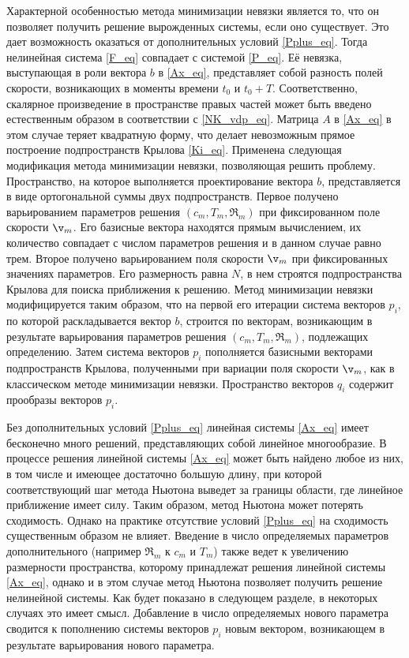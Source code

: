Характерной особенностью метода минимизации невязки является то, что он позволяет получить решение вырожденных системы, если оно существует. Это дает возможность оказаться от дополнительных условий \eqref{Pplus_eq}. Тогда нелинейная система \eqref{F_eq} совпадает с системой \eqref{P_eq}. Её невязка, выступающая в роли вектора $b$ в \eqref{Ax_eq}, представляет собой разность полей скорости, возникающих в моменты времени $t_0$ и $t_0 + T$. Соответственно, скалярное произведение в пространстве правых частей может быть введено естественным образом в соответствии с \eqref{NK_vdp_eq}. Матрица $A$ в \eqref{Ax_eq} в этом случае теряет квадратную форму, что делает невозможным прямое построение подпространств Крылова \eqref{Ki_eq}. Применена следующая модификация метода минимизации невязки, позволяющая решить проблему. Пространство, на которое выполняется проектирование вектора $b$, представляется в виде ортогональной суммы двух подпространств. Первое получено варьированием параметров решения $(c_m, T_m, \Re_m)$ при фиксированном поле скорости $\v_m$. Его базисные вектора находятся прямым вычислением, их количество совпадает с числом параметров решения и в данном случае равно трем. Второе получено варьированием поля скорости $\v_m$ при фиксированных значениях параметров. Его размерность равна $N$, в нем строятся подпространства Крылова для поиска приближения к решению. Метод минимизации невязки модифицируется таким образом, что на первой его итерации система векторов $p_i$, по которой раскладывается вектор $b$, строится по векторам, возникающим в результате варьирования параметров решения $(c_m, T_m, \Re_m)$, подлежащих определению.  Затем система векторов $p_i$ пополняется базисными векторами подпространств Крылова, полученными при вариации поля скорости $\v_m$, как в классическом методе минимизации невязки. Пространство векторов $q_i$ содержит прообразы векторов $p_i$.

Без дополнительных условий \eqref{Pplus_eq} линейная системы \eqref{Ax_eq} имеет бесконечно много решений, представляющих собой линейное многообразие. В процессе решения линейной системы \eqref{Ax_eq} может быть найдено любое из них, в том числе и имеющее достаточно большую длину, при которой соответствующий шаг метода Ньютона выведет за границы области, где линейное приближение имеет силу. Таким образом, метод Ньютона может потерять сходимость. Однако на практике отсутствие условий \eqref{Pplus_eq} на сходимость существенным образом не влияет. Введение в число определяемых параметров дополнительного (например $\Re_m$ к $c_m$ и $T_m$) также ведет к увеличению размерности пространства, которому принадлежат решения линейной системы \eqref{Ax_eq}, однако и в этом случае метод Ньютона позволяет получить решение нелинейной системы. Как будет показано в следующем разделе, в некоторых случаях это имеет смысл. Добавление в число определяемых нового параметра сводится к пополнению системы векторов $p_i$ новым вектором, возникающем в результате варьирования нового параметра. 

